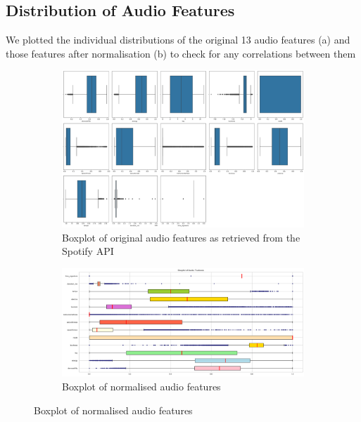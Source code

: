 \begin{appendix}
\section{Distribution of Audio Features}
\label{appendix:A}
We plotted the individual distributions of the original 13 audio features (a) and those features after normalisation (b) to check for any correlations between them
\begin{figure}[H]
\begin{subfigure}{1\textwidth}
\centering
    \includegraphics[scale=0.2]{Outputs/Boxplot - Original Audio Features.png}
    \captionsetup{justification=centering,margin=1cm}
    \caption{Boxplot of original audio features as retrieved from the Spotify API}
    \label{fig:sub-first}
\end{subfigure}
\newline
\begin{subfigure}{1\textwidth}
\centering
    \includegraphics[scale=0.3]{Outputs/Boxplot - Normalised Audio Features.png}
    \captionsetup{justification=centering,margin=1cm}
    \caption{Boxplot of normalised audio features}
    \label{fig:sub-second}
\end{subfigure}
\end{figure}


\end{appendix}
